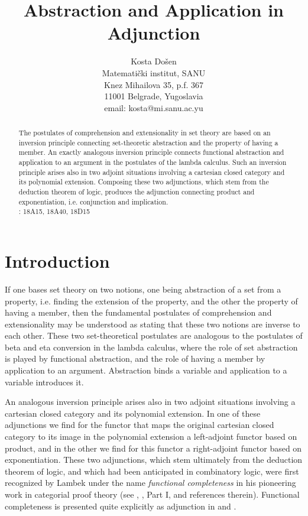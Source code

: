 \documentclass[12pt]{article}
\begin{document}
\title{{\bf Abstraction and Application in Adjunction}}
\author{{\sc Kosta Do\v sen} \\
Matemati\v {c}ki institut, SANU\\
Knez Mihailova 35, p.f. 367 \\
11001 Belgrade, Yugoslavia \\
email: kosta@mi.sanu.ac.yu}
\date{}
\maketitle

\begin{abstract}
\noindent The postulates of comprehension and extensionality in set theory
are based on an inversion principle connecting set-theoretic abstraction and
the property of having a member. An exactly analogous inversion principle
connects functional abstraction and application to an argument in the
postulates of the lambda calculus. Such an inversion principle arises also
in two adjoint situations involving a cartesian closed category and its
polynomial extension. Composing these two adjunctions, which stem from the
deduction theorem of logic, produces the adjunction connecting product and
exponentiation, i.e. conjunction and implication.\\[0.2cm]
: 18A15, 18A40, 18D15
\end{abstract}

\section{Introduction}

\noindent If one bases set theory on two notions, one being abstraction of a
set from a property, i.e. finding the extension of the property, and the
other the property of having a member, then the fundamental postulates of
comprehension and extensionality may be understood as stating that these two
notions are inverse to each other. These two set-theoretical postulates are
analogous to the postulates of beta and eta conversion in the lambda
calculus, where the role of set abstraction is played by functional
abstraction, and the role of having a member by application to an argument.
Abstraction binds a variable and application to a variable introduces it.

An analogous inversion principle arises also in two adjoint situations
involving a cartesian closed category and its polynomial extension. In one
of these adjunctions we find for the functor that maps the original
cartesian closed category to its image in the polynomial extension a
left-adjoint functor based on product, and in the other we find for this
functor a right-adjoint functor based on exponentiation. These two
adjunctions, which stem ultimately from the deduction theorem of logic, and
which had been anticipated in combinatory logic, were first recognized by
Lambek under the name {\it functional completeness} in his pioneering work
in categorial proof theory (see \cite{Lam74}, \cite{LS86}, Part I, and
references therein). Functional completeness is presented quite explicitly
as adjunction in \cite{Jac95} and \cite{D.96}.
\end{document}
